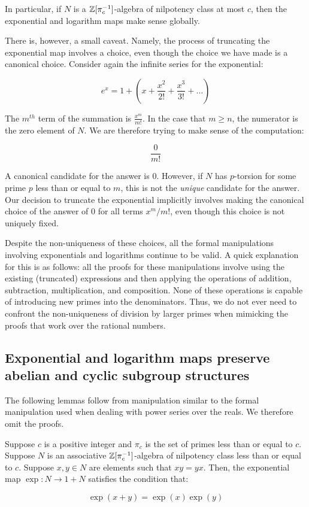 In particular, if $N$ is a $\mathbb{Z}[\pi_c^{-1}]$-algebra of nilpotency class
at most $c$, then the exponential and logarithm maps make sense globally.

There is, however, a small caveat. Namely, the process of truncating
the exponential map involves a choice, even though the choice we have
made is a canonical choice. Consider again the infinite series for the
exponential:

$$e^x = 1 + \left(x + \frac{x^2}{2!} + \frac{x^3}{3!} + \dots\right)$$

The $m^{th}$ term of the summation is $\frac{x^m}{m!}$. In the case
that $m \ge n$, the numerator is the zero element of $N$. We are
therefore trying to make sense of the computation:

$$\frac{0}{m!}$$

A canonical candidate for the answer is $0$. However, if $N$ has
$p$-torsion for some prime $p$ less than or equal to $m$, this is not
the {\em unique} candidate for the answer. Our decision to truncate
the exponential implicitly involves making the canonical choice of the
answer of $0$ for all terms $x^m/m!$, even though this choice is not
uniquely fixed.

Despite the non-uniqueness of these choices, all the formal
manipulations involving exponentials and logarithms continue to be
valid. A quick explanation for this is as follows: all the proofs for
these manipulations involve using the existing (truncated) expressions
and then applying the operations of addition, subtraction,
multiplication, and composition. None of these operations is capable
of introducing new primes into the denominators. Thus, we do not ever
need to confront the non-uniqueness of division by larger primes when
mimicking the proofs that work over the rational numbers.


\subsection{Exponential and logarithm maps preserve abelian and cyclic subgroup structures}

The following lemmas follow from manipulation similar to the formal
manipulation used when dealing with power series over the reals. We
therefore omit the proofs.

\begin{lemma}\label{lemma:exp-and-commutative}
  Suppose $c$ is a positive integer and $\pi_c$ is the set of primes
  less than or equal to $c$. Suppose $N$ is an associative
  $\mathbb{Z}[\pi_c^{-1}]$-algebra of nilpotency class less than or equal to
  $c$. Suppose $x,y \in N$ are elements such that $xy = yx$. Then, the
  exponential map $\exp: N \to 1 + N$ satisfies the condition that:

  $$\exp(x + y) = \exp(x) \exp (y)$$
\end{lemma}


